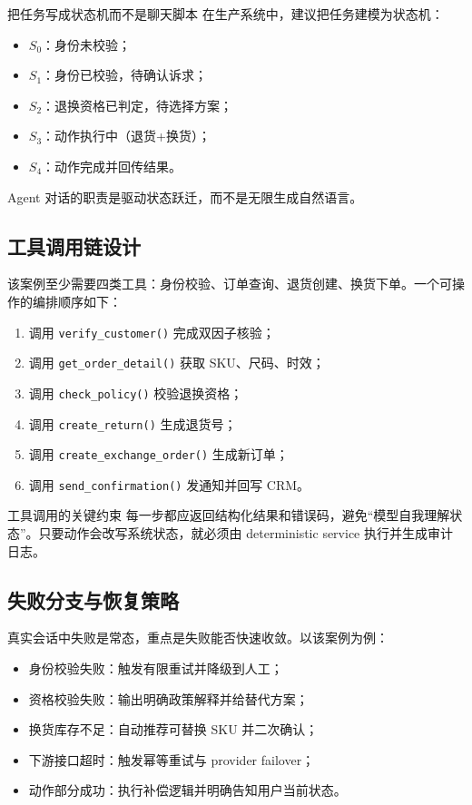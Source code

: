 \documentclass[a4paper]{article}
\begin{document}
\begin{knowledgebox}{把任务写成状态机而不是聊天脚本}
在生产系统中，建议把任务建模为状态机：
\begin{itemize}[leftmargin=1.5em]
    \item $S_0$：身份未校验；
    \item $S_1$：身份已校验，待确认诉求；
    \item $S_2$：退换资格已判定，待选择方案；
    \item $S_3$：动作执行中（退货+换货）；
    \item $S_4$：动作完成并回传结果。
\end{itemize}
Agent 对话的职责是驱动状态跃迁，而不是无限生成自然语言。
\end{knowledgebox}

\subsection{工具调用链设计}

该案例至少需要四类工具：身份校验、订单查询、退货创建、换货下单。一个可操作的编排顺序如下：
\begin{enumerate}[leftmargin=1.8em]
    \item 调用 \texttt{verify\_customer()} 完成双因子核验；
    \item 调用 \texttt{get\_order\_detail()} 获取 SKU、尺码、时效；
    \item 调用 \texttt{check\_policy()} 校验退换资格；
    \item 调用 \texttt{create\_return()} 生成退货号；
    \item 调用 \texttt{create\_exchange\_order()} 生成新订单；
    \item 调用 \texttt{send\_confirmation()} 发通知并回写 CRM。
\end{enumerate}

\begin{importantbox}{工具调用的关键约束}
每一步都应返回结构化结果和错误码，避免“模型自我理解状态”。只要动作会改写系统状态，就必须由 deterministic service 执行并生成审计日志。
\end{importantbox}

\subsection{失败分支与恢复策略}

真实会话中失败是常态，重点是失败能否快速收敛。以该案例为例：
\begin{itemize}[leftmargin=1.5em]
    \item 身份校验失败：触发有限重试并降级到人工；
    \item 资格校验失败：输出明确政策解释并给替代方案；
    \item 换货库存不足：自动推荐可替换 SKU 并二次确认；
    \item 下游接口超时：触发幂等重试与 provider failover；
    \item 动作部分成功：执行补偿逻辑并明确告知用户当前状态。
\end{itemize}
\end{document}
